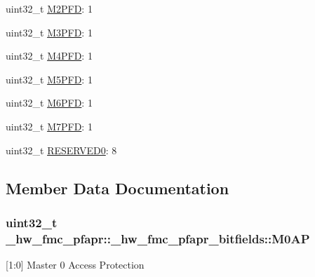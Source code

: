 \begin{DoxyCompactItemize}
uint32\+\_\+t \hyperlink{struct__hw__fmc__pfapr_1_1__hw__fmc__pfapr__bitfields_a02d558b34f0648f43606d237141bcde1}{M2\+P\+FD}\+: 1
\item 
uint32\+\_\+t \hyperlink{struct__hw__fmc__pfapr_1_1__hw__fmc__pfapr__bitfields_a7334fdb5f108bcf444a3a0708c5be0ac}{M3\+P\+FD}\+: 1
\item 
uint32\+\_\+t \hyperlink{struct__hw__fmc__pfapr_1_1__hw__fmc__pfapr__bitfields_a740f7878faf455f712f571d9cb680f04}{M4\+P\+FD}\+: 1
\item 
uint32\+\_\+t \hyperlink{struct__hw__fmc__pfapr_1_1__hw__fmc__pfapr__bitfields_a43aa5e2fa20a68bbcb5da776a2ad8ebf}{M5\+P\+FD}\+: 1
\item 
uint32\+\_\+t \hyperlink{struct__hw__fmc__pfapr_1_1__hw__fmc__pfapr__bitfields_a396c89938059ac090ce75fbadf3ee93f}{M6\+P\+FD}\+: 1
\item 
uint32\+\_\+t \hyperlink{struct__hw__fmc__pfapr_1_1__hw__fmc__pfapr__bitfields_a35980c6497a99a60c62e0835537ed02d}{M7\+P\+FD}\+: 1
\item 
uint32\+\_\+t \hyperlink{struct__hw__fmc__pfapr_1_1__hw__fmc__pfapr__bitfields_a3889bb7c4930fee3d2e480583cac85c6}{R\+E\+S\+E\+R\+V\+E\+D0}\+: 8
\end{DoxyCompactItemize}


\subsection{Member Data Documentation}
\subsubsection[{\texorpdfstring{M0\+AP}{M0AP}}]{\setlength{\rightskip}{0pt plus 5cm}uint32\+\_\+t \+\_\+hw\+\_\+fmc\+\_\+pfapr\+::\+\_\+hw\+\_\+fmc\+\_\+pfapr\+\_\+bitfields\+::\+M0\+AP}\hypertarget{struct__hw__fmc__pfapr_1_1__hw__fmc__pfapr__bitfields_add522ca778c968fb0b01a42ff7262841}{}\label{struct__hw__fmc__pfapr_1_1__hw__fmc__pfapr__bitfields_add522ca778c968fb0b01a42ff7262841}
\mbox{[}1\+:0\mbox{]} Master 0 Access Protection 
